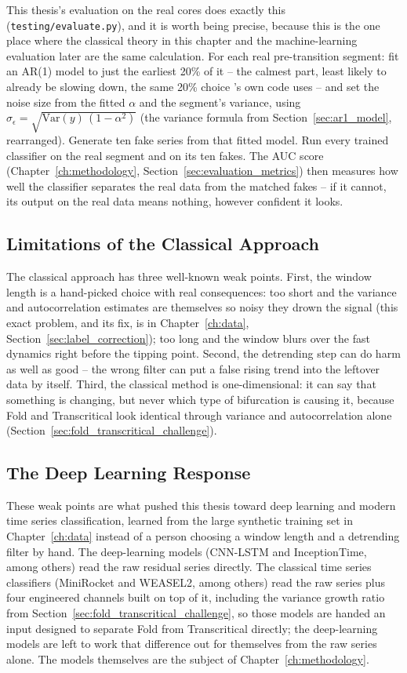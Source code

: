 This thesis's evaluation on the real cores does exactly this (\texttt{testing/evaluate.py}), and it is worth being precise, because this is the one place where the classical theory in this chapter and the machine-learning evaluation later are the same calculation. For each real pre-transition segment: fit an AR(1) model to just the earliest 20\% of it -- the calmest part, least likely to already be slowing down, the same 20\% choice \citet{bury2021}'s own code uses -- and set the noise size from the fitted $\alpha$ and the segment's variance, using $\sigma_\epsilon = \sqrt{\text{Var}(y)\,(1-\alpha^2)}$ (the variance formula from Section~\ref{sec:ar1_model}, rearranged). Generate ten fake series from that fitted model. Run every trained classifier on the real segment and on its ten fakes. The AUC score (Chapter~\ref{ch:methodology}, Section~\ref{sec:evaluation_metrics}) then measures how well the classifier separates the real data from the matched fakes -- if it cannot, its output on the real data means nothing, however confident it looks.

\subsection{Limitations of the Classical Approach}
The classical approach has three well-known weak points. First, the window length is a hand-picked choice with real consequences: too short and the variance and autocorrelation estimates are themselves so noisy they drown the signal (this exact problem, and its fix, is in Chapter~\ref{ch:data}, Section~\ref{sec:label_correction}); too long and the window blurs over the fast dynamics right before the tipping point. Second, the detrending step can do harm as well as good -- the wrong filter can put a false rising trend into the leftover data by itself. Third, the classical method is one-dimensional: it can say that something is changing, but never which type of bifurcation is causing it, because Fold and Transcritical look identical through variance and autocorrelation alone (Section~\ref{sec:fold_transcritical_challenge}).

\subsection{The Deep Learning Response}
These weak points are what pushed this thesis toward deep learning and modern time series classification, learned from the large synthetic training set in Chapter~\ref{ch:data} instead of a person choosing a window length and a detrending filter by hand. The deep-learning models (CNN-LSTM and InceptionTime, among others) read the raw residual series directly. The classical time series classifiers (MiniRocket and WEASEL2, among others) read the raw series plus four engineered channels built on top of it, including the variance growth ratio from Section~\ref{sec:fold_transcritical_challenge}, so those models are handed an input designed to separate Fold from Transcritical directly; the deep-learning models are left to work that difference out for themselves from the raw series alone. The models themselves are the subject of Chapter~\ref{ch:methodology}.
